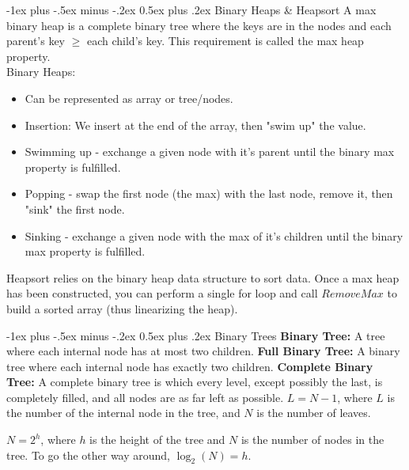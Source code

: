 \documentclass[letterpaper, 8pt]{extarticle}
\makeatletter
\renewcommand{\section}{\@startsection{section}{1}{0mm}%
                                {-1ex plus -.5ex minus -.2ex}%
                                {0.5ex plus .2ex}%
                                {\normalfont\normalsize\bfseries}}
\makeatother
\begin{document}
\begin{multicols*}{4}
  \section{Binary Heaps \& Heapsort}
  A max binary heap is a complete binary tree where the keys are in the nodes and each parent's key $\geq$ each child's key. This requirement is called the max heap property.
  \\
  Binary Heaps:
  \begin{itemize}
    \item Can be represented as array or tree/nodes.
    \item Insertion: We insert at the end of the array, then "swim up" the value.
    \item Swimming up - exchange a given node with it's parent until the binary max property is fulfilled.
    \item Popping - swap the first node (the max) with the last node, remove it, then "sink" the first node.
    \item Sinking - exchange a given node with the max of it's children until the binary max property is fulfilled.
  \end{itemize}

  Heapsort relies on the binary heap data structure to sort data. Once a max heap has been constructed, you can perform a single for loop and call $RemoveMax$ to build a sorted array (thus linearizing the heap).

  \section{Binary Trees}
  \textbf{Binary Tree:} A tree where each internal node has at most two children.
  \textbf{Full Binary Tree:} A binary tree where each internal node has exactly two children.
  \textbf{Complete Binary Tree:} A complete binary tree is which every level,
  except possibly the last, is completely filled, and all nodes are as far left as possible.
  $L = N - 1$, where $L$ is the number of the internal node in the tree,
  and $N$ is the number of leaves.

  $N = 2^h$, where $h$ is the height of the tree and $N$ is the number of nodes in the tree.
  To go the other way around, $\log_2(N) = h$.


\end{multicols*}
\end{document}
